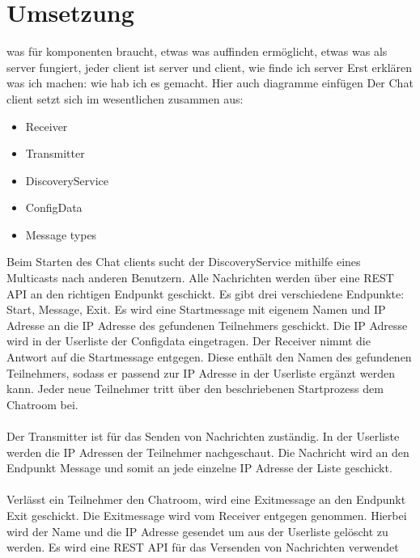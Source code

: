 \section{Umsetzung}
was für komponenten braucht, etwas was auffinden ermöglicht, etwas was als server fungiert, jeder client ist server und client, wie finde ich server
Erst erklären was ich machen: wie hab ich es gemacht. Hier auch diagramme einfügen 
Der Chat client setzt sich im wesentlichen zusammen aus:
\begin{itemize}
    \item Receiver
    \item Transmitter
    \item DiscoveryService
    \item ConfigData
    \item Message types
\end{itemize} 
Beim Starten des Chat clients sucht der DiscoveryService mithilfe eines Multicasts nach anderen Benutzern.
Alle Nachrichten werden über eine REST API an den richtigen Endpunkt geschickt. Es gibt drei verschiedene Endpunkte: Start, Message, Exit.
Es wird eine Startmessage mit eigenem Namen und IP Adresse an die IP Adresse des gefundenen Teilnehmers geschickt.  
Die IP Adresse wird in der Userliste der Configdata eingetragen.
Der Receiver nimmt die Antwort auf die Startmessage entgegen. Diese enthält den Namen des gefundenen Teilnehmers, sodass er passend zur IP Adresse in der Userliste ergänzt werden kann.
Jeder neue Teilnehmer tritt über den beschriebenen Startprozess dem Chatroom bei. 
\\
\\
Der Transmitter ist für das Senden von Nachrichten zuständig. In der Userliste werden die IP Adressen der Teilnehmer nachgeschaut. 
Die Nachricht wird an den Endpunkt Message und somit an jede einzelne IP Adresse der Liste geschickt. 
\\
\\
Verlässt ein Teilnehmer den Chatroom, wird eine Exitmessage an den Endpunkt Exit geschickt. Die Exitmessage wird vom Receiver entgegen genommen. 
Hierbei wird der Name und die IP Adresse gesendet um aus der Userliste gelöscht zu werden. 
Es wird eine REST API für das Versenden von Nachrichten verwendet